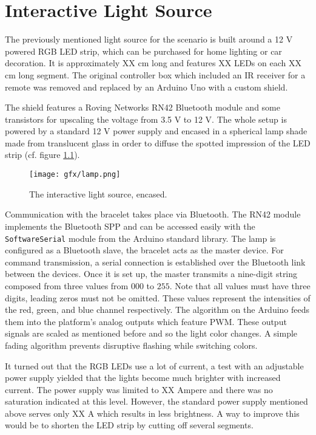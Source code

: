 \chapter{Interactive Light Source}

The previously mentioned light source for the scenario is built around a 12 V powered RGB \ac{LED} strip, which can be purchased for home lighting or car decoration. It is approximately XX cm long and features XX \ac{LED}s on each XX cm long segment. The original controller box which included an \ac{IR} receiver for a remote was removed and replaced by an Arduino Uno \cite{arduino_uno} with a custom shield. 

The shield features a Roving Networks RN42 Bluetooth module \cite{datasheet_rn42} and some transistors for upscaling the voltage from 3.5 V to 12 V. The whole setup is powered by a standard 12 V power supply and encased in a spherical lamp shade made from translucent glass in order to diffuse the spotted impression of the LED strip (cf. figure \ref{fig:lamp}).

\begin{figure}[bth]
	\begin{center}
		\texttt{[image: gfx/lamp.png]}
	\end{center}
	\label{fig:lamp}
	\caption{The interactive light source, encased.}
\end{figure} 

Communication with the bracelet takes place via Bluetooth. The RN42 module implements the Bluetooth \ac{SPP} and can be accessed easily with the \texttt{SoftwareSerial} module from the Arduino standard library. The lamp is configured as a Bluetooth slave, the bracelet acts as the master device. For command transmission, a serial connection is established over the Bluetooth link between the devices. Once it is set up, the master transmits a nine-digit string composed from three values from $000$ to $255$. Note that all values must have three digits, leading zeros must not be omitted. These values represent the intensities of the red, green, and blue channel respectively. The algorithm on the Arduino feeds them into the platform's analog outputs which feature \ac{PWM}. These output signals are scaled as mentioned before and so the light color changes. A simple fading algorithm prevents disruptive flashing while switching colors.

It turned out that the RGB \ac{LED}s use a lot of current, a test with an adjustable power supply yielded that the lights become much brighter with increased current. The power supply was limited to XX Ampere and there was no saturation indicated at this level. However, the standard power supply mentioned above serves only XX A which results in less brightness. A way to improve this would be to shorten the \ac{LED} strip by cutting off several segments.